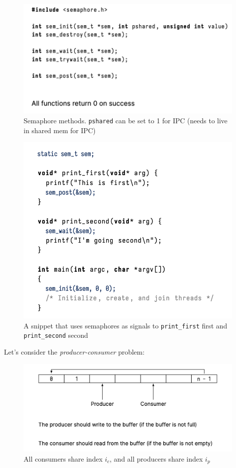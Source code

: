 \documentclass[../notes.tex]{subfiles}
\begin{document}
\begin{figure}[H]
    \centering
    \includegraphics[width=0.8\linewidth]{img/image_2023-03-08-14-08-18.png}
    \caption{Semaphore methods. \texttt{pshared} can be set to 1 for IPC (needs to live in shared mem for IPC)}
\end{figure}




\begin{figure}[H]
    \centering
    \includegraphics[width=0.8\linewidth]{img/image_2023-03-08-14-09-35.png}
    \caption{A snippet that uses semaphores as signals to \texttt{print\_first} first and \texttt{print\_second} second}
\end{figure}



Let's consider the \textit{producer-consumer} problem:

\begin{figure}[H]
    \centering
    \includegraphics[width=0.8\linewidth]{img/image_2023-03-08-14-11-55.png}
    \caption{All consumers share index $ i_c $, and all producers share index $ i_p $ }
\end{figure}
\end{document}
